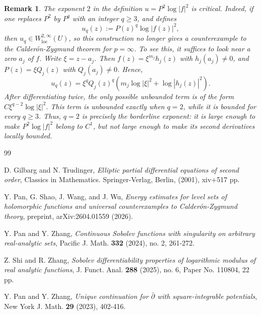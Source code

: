 \documentclass[12pt,twoside]{amsart}
\numberwithin{equation}{section}
\numberwithin{definition}{section} %
\newtheorem{remark}{Remark}
\begin{document}
    \begin{remark}
		The exponent $2$ in the definition $u=P^2\log |f|^2$ is critical. Indeed, if one replaces
		$P^2$ by $P^q$ with an integer $q\ge3$, and defines
		$$
		u_q(z):=P(z)^q\log |f(z)|^2,
		$$
		then $u_q\in W^{2,\infty}_{\mathrm{loc}}(U)$, so this construction no longer gives a
		counterexample to the Calder\'on-Zygmund theorem  for $p=\infty$.
		To see this, it suffices to look near a zero $a_j$ of $f$. Write $\xi=z-a_j$. Then
		$f(z)=\xi^{m_j}h_j(z)$ with $h_j(a_j)\neq0$, and $P(z)=\xi Q_j(z)$ with
		$Q_j(a_j)\neq0$. Hence,
		$$
		u_q(z)=\xi^q Q_j(z)^q\left(m_j\log|\xi|^2+\log|h_j(z)|^2\right).
		$$
		After differentiating twice, the only possible unbounded term is of the form
		$
		C\xi^{q-2}\log|\xi|^2.
		$
		This term is unbounded exactly when $q=2$, while it is bounded for every $q\ge3$.
		Thus, $q=2$ is precisely the borderline exponent: it is large enough to make
		$P^2\log|f|^2$ belong to $C^1$, but not large enough to make its second derivatives
		locally bounded.
	\end{remark}








\begin{thebibliography}{99}


D. Gilbarg and N. Trudinger, \emph{Elliptic partial differential equations of second order}, Classics in Mathematics. Springer-Verlag, Berlin, (2001), xiv+517 pp.

Y. Pan, G. Shao, J. Wang, and J. Wu, \emph{Energy estimates for level sets of holomorphic functions and universal counterexamples to Calder\'on-Zygmund theory}, preprint, arXiv:2604.01559 (2026).

Y. Pan and Y. Zhang, \emph{Continuous Sobolev functions with singularity on arbitrary real-analytic sets}, Pacific J. Math. \textbf{332} (2024), no. 2, 261-272.

Z. Shi and R. Zhang, \emph{Sobolev differentiability properties of logarithmic modulus of real analytic functions}, J. Funct. Anal. \textbf{288} (2025), no. 6, Paper No. 110804, 22 pp.

Y. Pan and Y. Zhang, \emph{Unique continuation for $\bar{\partial}$ with square-integrable potentials}, New York J. Math. \textbf{29} (2023), 402-416.
\end{thebibliography}
\end{document}
